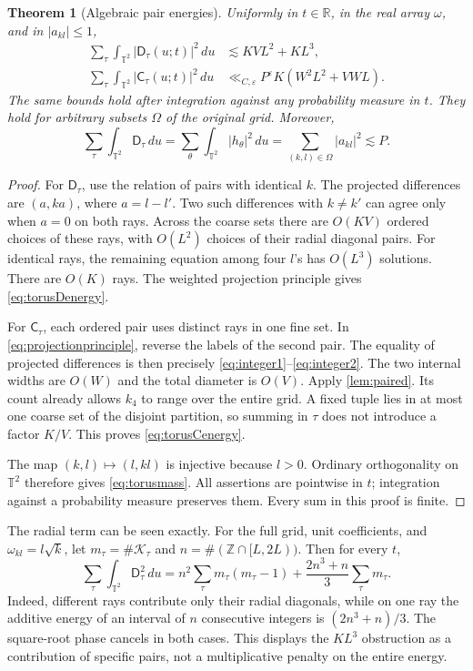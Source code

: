 \documentclass[11pt,reqno]{amsart}
\numberwithin{equation}{section}
\newtheorem{theorem}{Theorem}[section]
\theoremstyle{definition}
\theoremstyle{remark}
\newcommand{\R}{\mathbb R}
\newcommand{\T}{\mathbb T}
\newcommand{\Z}{\mathbb Z}
\newcommand{\eps}{\varepsilon}
\begin{document}
\begin{theorem}[Algebraic pair energies]\label{thm:algebraic}
Uniformly in $t\in\R$, in the real array $\omega$, and in $|a_{kl}|\le1$,
\begin{align}
 \sum_\tau\int_{\T^2}|\mathsf D_\tau(u;t)|^2\,du
   &\lesssim KVL^2+KL^3,\label{eq:torusDenergy}\\
 \sum_\tau\int_{\T^2}|\mathsf C_\tau(u;t)|^2\,du
   &\ll_{C,\eps}P^\eps K(W^2L^2+VWL).
       \label{eq:torusCenergy}
\end{align}
The same bounds hold after integration against any probability measure in $t$.
They hold for arbitrary subsets $\Omega$ of the original grid.
Moreover,
\begin{equation}\label{eq:torusmass}
 \sum_\tau\int_{\T^2}\mathsf D_\tau\,du
 =\sum_\theta\int_{\T^2}|h_\theta|^2\,du
 =\sum_{(k,l)\in\Omega}|a_{kl}|^2\lesssim P.
\end{equation}
\end{theorem}
\begin{proof}
For $\mathsf D_\tau$, use the relation of pairs with identical $k$.
The projected differences are $(a,ka)$, where $a=l-l'$.
Two such differences with $k\ne k'$ can agree only when $a=0$ on both rays.
Across the coarse sets there are $O(KV)$ ordered choices of these rays,
with $O(L^2)$ choices of their radial diagonal pairs.
For identical rays, the remaining equation among four $l$'s has $O(L^3)$ solutions.
There are $O(K)$ rays. The weighted projection principle gives
\eqref{eq:torusDenergy}.

For $\mathsf C_\tau$, each ordered pair uses distinct rays in one fine set.
In \eqref{eq:projectionprinciple}, reverse the labels of the second pair.
The equality of projected differences is then precisely
\eqref{eq:integer1}--\eqref{eq:integer2}.
The two internal widths are $O(W)$ and the total diameter is $O(V)$.
Apply \cref{lem:paired}.
Its count already allows $k_4$ to range over the entire grid.
A fixed tuple lies in at most one coarse set of the disjoint partition, so summing in
$\tau$ does not introduce a factor $K/V$.
This proves \eqref{eq:torusCenergy}.

The map $(k,l)\mapsto(l,kl)$ is injective because $l>0$.
Ordinary orthogonality on $\T^2$ therefore gives \eqref{eq:torusmass}.
All assertions are pointwise in $t$; integration against a probability measure preserves
them. Every sum in this proof is finite.
\end{proof}

The radial term can be seen exactly. For the full grid, unit coefficients, and
$\omega_{kl}=l\sqrt{k}$, let $m_\tau=\#\mathcal K_\tau$ and
$n=\#(\Z\cap[L,2L))$. Then for every $t$,
\begin{equation}\label{eq:exactradial}
 \sum_\tau\int_{\T^2}\mathsf D_\tau^2\,du
 =n^2\sum_\tau m_\tau(m_\tau-1)
   +\frac{2n^3+n}{3}\sum_\tau m_\tau.
\end{equation}
Indeed, different rays contribute only their radial diagonals, while on one ray the
additive energy of an interval of $n$ consecutive integers is $(2n^3+n)/3$.
The square-root phase cancels in both cases.
This displays the $KL^3$ obstruction as a contribution of specific pairs, not a
multiplicative penalty on the entire energy.
\end{document}
